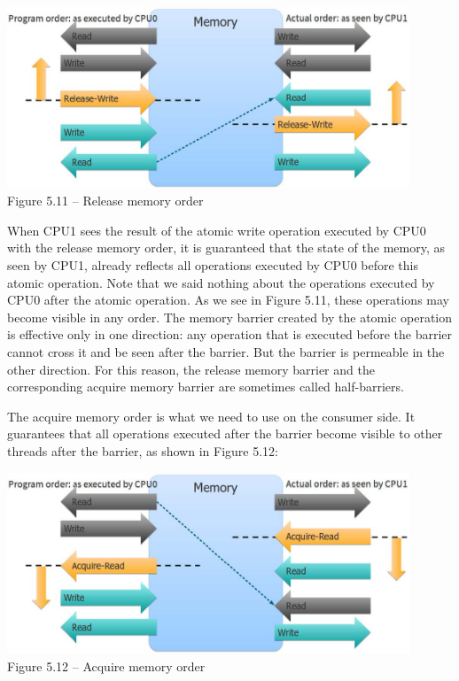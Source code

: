 \begin{center}
\includegraphics[width=0.9\textwidth]{content/1/chapter5/images/11.jpg}\\
Figure 5.11 – Release memory order
\end{center}

When CPU1 sees the result of the atomic write operation executed by CPU0 with the release memory order, it is guaranteed that the state of the memory, as seen by CPU1, already reflects all operations executed by CPU0 before this atomic operation. Note that we said nothing about the operations executed by CPU0 after the atomic operation. As we see in Figure 5.11, these operations may become visible in any order. The memory barrier created by the atomic operation is effective only in one direction: any operation that is executed before the barrier cannot cross it and be seen after the barrier. But the barrier is permeable in the other direction. For this reason, the release memory barrier and the corresponding acquire memory barrier are sometimes called half-barriers.

The acquire memory order is what we need to use on the consumer side. It guarantees that all operations executed after the barrier become visible to other threads after the barrier, as shown in Figure 5.12:

\begin{center}
\includegraphics[width=0.9\textwidth]{content/1/chapter5/images/12.jpg}\\
Figure 5.12 – Acquire memory order
\end{center}

